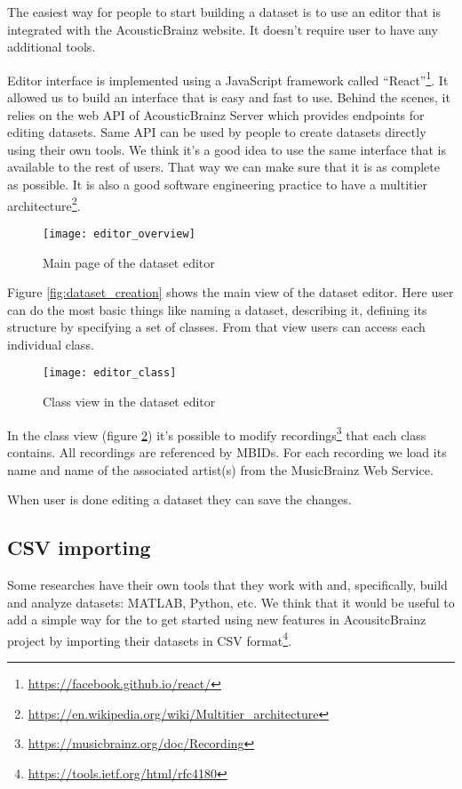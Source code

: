 The easiest way for people to start building a dataset is to use an editor that is integrated with the AcousticBrainz website. It doesn't require user to have any additional tools.

Editor interface is implemented using a JavaScript framework called ``React''\footnote{\url{https://facebook.github.io/react/}}. It allowed us to build an interface that is easy and fast to use. Behind the scenes, it relies on the web API of AcousticBrainz Server which provides endpoints for editing datasets. Same API can be used by people to create datasets directly using their own tools. We think it's a good idea to use the same interface that is available to the rest of users. That way we can make sure that it is as complete as possible. It is also a good software engineering practice to have a multitier architecture\footnote{\url{https://en.wikipedia.org/wiki/Multitier_architecture}}.

\begin{figure}[h]
  \centering
  \texttt{[image: editor\_overview]}
    \caption{Main page of the dataset editor}
    \label{fig:editor_overview}
\end{figure}

Figure \ref{fig:dataset_creation} shows the main view of the dataset editor. Here user can do the most basic things like naming a dataset, describing it, defining its structure by specifying a set of classes. From that view users can access each individual class.

\begin{figure}[h]
  \centering
  \texttt{[image: editor\_class]}
    \caption{Class view in the dataset editor}
    \label{fig:editor_class}
\end{figure}

In the class view (figure \ref{fig:editor_class}) it's possible to modify recordings\footnote{\url{https://musicbrainz.org/doc/Recording}} that each class contains. All recordings are referenced by MBIDs. For each recording we load its name and name of the associated artist(s) from the MusicBrainz Web Service.

When user is done editing a dataset they can save the changes.

\subsection{CSV importing}

Some researches have their own tools that they work with and, specifically, build and analyze datasets: MATLAB, Python, etc. We think that it would be useful to add a simple way for the to get started using new features in AcousitcBrainz project by importing their datasets in CSV format\footnote{\url{https://tools.ietf.org/html/rfc4180}}.

